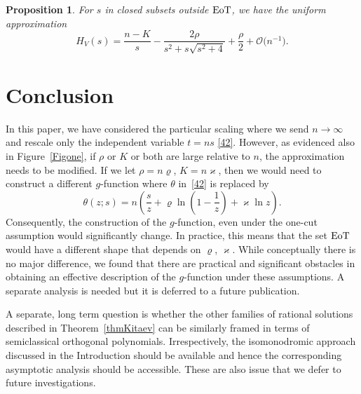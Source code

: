 \documentclass[pdftex]{sigma}
\numberwithin{equation}{section}
\newtheorem{Proposition}[Theorem]{Proposition}
\theoremstyle{definition}
\def\le{\left}
\def\ri{\right}
\begin{document}
 \begin{Proposition} \label{H_Vapproxout}
 For $s$ in closed subsets outside ${\rm EoT}$, we have the uniform approximation
\[
 H_V(s) = \frac{n-{K}}s
 - \frac {2{\rho}}{s^2 + s \sqrt{s^2+4}}
 +\frac { {\rho}} 2 + \mathcal O\bigl(n^{-1}\bigr).
\]
 \end{Proposition}

\section{Conclusion}
In this paper, we have considered the particular scaling where we send $n\to\infty$ and rescale only the independent variable $t = ns$ \eqref{42}. However, as evidenced also in Figure~\ref{Figone}, if $ {\rho}$ or $ {K}$ or both are large relative to $n$, the approximation needs to be modified.
 If we let $ {\rho} = n \varrho$, $ {K} = n \varkappa$, then we would need to construct a different $g$-function where $\theta$ in~\eqref{42} is replaced by
\[
\theta(z;s) = n\le(\frac s z+ \varrho \ln \le(1-\frac 1 z \ri) + \varkappa \ln z\ri).
\]
Consequently, the construction of the $g$-function, even under the one-cut assumption would significantly change. In practice, this means that the set ${\rm EoT}$ would have a different shape that depends on $\varrho$, $\varkappa$. While conceptually there is no major difference, we found that there are practical and significant obstacles in obtaining an effective description of the $g$-function under these assumptions. A separate analysis is needed but it is deferred to a future publication.

A separate, long term question is whether the other families of rational solutions described in Theorem~\ref{thmKitaev} can be similarly framed in terms of semiclassical orthogonal polynomials. Irrespectively, the isomonodromic approach discussed in the Introduction should be available and hence the corresponding asymptotic analysis should be accessible. These are also issue that we defer to future investigations.

\vspace{-1mm}

\appendix
\end{document}
